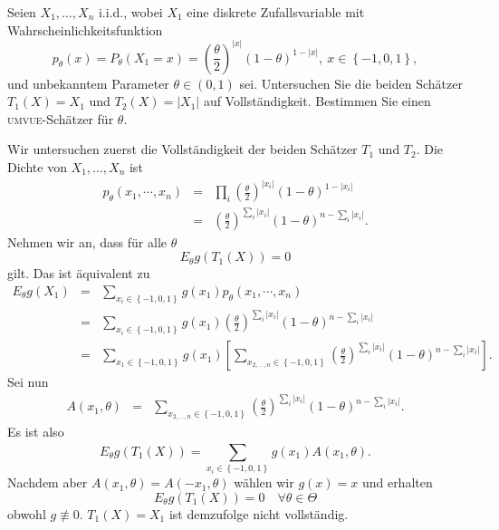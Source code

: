   Seien $X_1,\ldots,X_n$ i.i.d.,
wobei $X_1$ eine diskrete Zufallsvariable mit Wahrscheinlichkeitsfunktion
\begin{equation*}
	p_\theta(x)=P_\theta(X_1=x)= 
	\left( \frac{\theta}{2} \right)^{|x|} (1-\theta)^{1-|x|},\  
	x\in\left\{ -1,0,1 \right\},
\end{equation*}
und unbekanntem Parameter $\theta\in (0,1)$ sei. Untersuchen Sie die beiden
Schätzer $T_1(X)=X_1$ und $T_2(X)=|X_1|$ auf Vollständigkeit. Bestimmen Sie
einen \textsc{umvue}-Schätzer für $\theta$.

\solution 
Wir untersuchen zuerst die Vollständigkeit der beiden Schätzer $T_1$ und $T_2$. 
Die Dichte von $X_1,\ldots,X_n$ ist
\begin{eqnarray}
	p_\theta(x_1, \cdots, x_n) &=& \prod_i \left( \frac{\theta}{2} \right)^{|x_i|} \left( 1-\theta \right)^{1-|x_i|} \\
	&=& \left( \frac{\theta}{2} \right)^{\sum_{i}^{} |x_i|} \left( 1-\theta \right)^{n-\sum_{i}^{} |x_i|}.
\end{eqnarray}
Nehmen wir an, dass für alle $\theta$
\begin{equation}
	E_\theta g\left( T_1\left( X \right) \right) = 0
\end{equation}
gilt. Das ist äquivalent zu 
\begin{eqnarray}
	E_\theta g\left( X_1 \right) &=&  \sum_{x_i\in\left\{ -1,0,1 \right\}}^{} g(x_1) p_\theta \left( x_1,\cdots,x_n \right) \\
	&=& \sum_{x_i\in\left\{ -1,0,1 \right\}}^{} g(x_1) \left( \frac{\theta}{2} \right)^{\sum_{i}^{} |x_i|} \left( 1-\theta \right)^{n-\sum_{i}^{} |x_i|} \\
	&=& \sum_{x_1\in\left\{ -1,0,1 \right\}}^{} g(x_1) \left[  \sum_{x_{2,\ldots,n}\in\left\{ -1,0,1 \right\}}^{}\left( \frac{\theta}{2} \right)^{\sum_{i}^{} |x_i|}\left( 1-\theta \right)^{n-\sum_{i}^{} |x_i|}   \right].
\end{eqnarray}
Sei nun
\begin{eqnarray}
	A(x_1, \theta) &=& \sum_{x_{2,\ldots,n}\in\left\{ -1,0,1 \right\}}^{}\left( \frac{\theta}{2} \right)^{\sum_{i}^{} |x_i|}\left( 1-\theta \right)^{n-\sum_{i}^{} |x_i|}.
\end{eqnarray}
Es ist also 
\begin{equation}
	E_\theta g\left( T_1\left( X \right) \right) = \sum_{x_i\in\left\{ -1,0,1 \right\}}^{} g(x_1) A\left( x_1, \theta \right).
\end{equation}
Nachdem aber $A\left( x_1,\theta \right) = A(-x_1,\theta)$ wählen wir $g\left( x \right)=x$ und erhalten
\begin{equation}
	E_\theta g\left( T_1\left( X \right) \right) = 0 \quad \forall \theta\in\Theta
\end{equation}
obwohl $g\nequiv 0$. $T_1(X)=X_1$ ist demzufolge nicht vollständig. 

